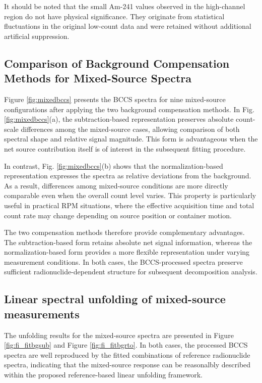 \documentclass[10pt]{wlscirep}
\begin{document}
It should be noted that the small Am-241 values observed in the high-channel region do not have physical significance. They originate from statistical fluctuations in the original low-count data and were retained without additional artificial suppression.

\subsection*{Comparison of Background Compensation Methods for Mixed-Source Spectra}

Figure \ref{fig:mixedbccs} presents the BCCS spectra for nine mixed-source configurations after applying the two background compensation methods. In Fig.\ref{fig:mixedbccs}(a), the subtraction-based representation preserves absolute count-scale differences among the mixed-source cases, allowing comparison of both spectral shape and relative signal magnitude. This form is advantageous when the net source contribution itself is of interest in the subsequent fitting procedure.

In contrast, Fig. \ref{fig:mixedbccs}(b) shows that the normalization-based representation expresses the spectra as relative deviations from the background. As a result, differences among mixed-source conditions are more directly comparable even when the overall count level varies. This property is particularly useful in practical RPM situations, where the effective acquisition time and total count rate may change depending on source position or container motion.

The two compensation methods therefore provide complementary advantages. The subtraction-based form retains absolute net signal information, whereas the normalization-based form provides a more flexible representation under varying measurement conditions. In both cases, the BCCS-processed spectra preserve sufficient radionuclide-dependent structure for subsequent decomposition analysis.


\subsection*{Linear spectral unfolding of mixed-source measurements}

The unfolding results for the mixed-source spectra are presented in Figure \ref{fig:fi_fitbgsub} and Figure \ref{fig:fi_fitbgrto}. In both cases, the processed BCCS spectra are well reproduced by the fitted combinations of reference radionuclide spectra, indicating that the mixed-source response can be reasonalbly described within the proposed reference-based linear unfolding framework.
\end{document}
